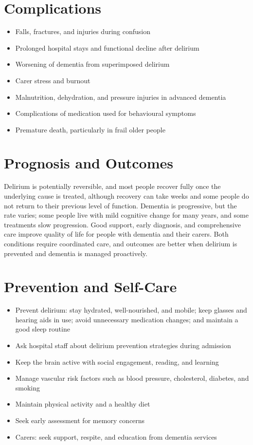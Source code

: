 \section*{Complications}
\begin{itemize}
    \item Falls, fractures, and injuries during confusion
    \item Prolonged hospital stays and functional decline after delirium
    \item Worsening of dementia from superimposed delirium
    \item Carer stress and burnout
    \item Malnutrition, dehydration, and pressure injuries in advanced dementia
    \item Complications of medication used for behavioural symptoms
    \item Premature death, particularly in frail older people
\end{itemize}

\section*{Prognosis and Outcomes}
Delirium is potentially reversible, and most people recover fully once the underlying cause is treated, although recovery can take weeks and some people do not return to their previous level of function. Dementia is progressive, but the rate varies; some people live with mild cognitive change for many years, and some treatments slow progression. Good support, early diagnosis, and comprehensive care improve quality of life for people with dementia and their carers. Both conditions require coordinated care, and outcomes are better when delirium is prevented and dementia is managed proactively.

\section*{Prevention and Self-Care}
\begin{itemize}
    \item Prevent delirium: stay hydrated, well-nourished, and mobile; keep glasses and hearing aids in use; avoid unnecessary medication changes; and maintain a good sleep routine
    \item Ask hospital staff about delirium prevention strategies during admission
    \item Keep the brain active with social engagement, reading, and learning
    \item Manage vascular risk factors such as blood pressure, cholesterol, diabetes, and smoking
    \item Maintain physical activity and a healthy diet
    \item Seek early assessment for memory concerns
    \item Carers: seek support, respite, and education from dementia services
\end{itemize}

